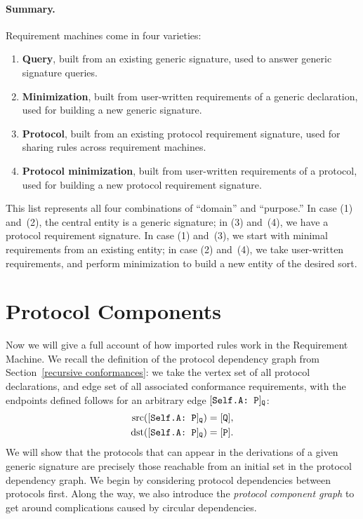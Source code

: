\documentclass[../generics]{subfiles}
\begin{document}
\paragraph{Summary.}
Requirement machines come in four varieties:
\begin{enumerate}
\item \textbf{Query}, built from an existing generic signature, used to answer generic signature queries.
\item \textbf{Minimization}, built from user-written requirements of a generic declaration, used for building a new generic signature.
\item \textbf{Protocol}, built from an existing protocol requirement signature, used for sharing rules across requirement machines.
\item \textbf{Protocol minimization}, built from user-written requirements of a protocol, used for building a new protocol requirement signature.
\end{enumerate}

This list represents all four combinations of ``domain'' and ``purpose.'' In case (1) and~(2), the central entity is a generic signature; in (3) and~(4), we have a protocol requirement signature. In case (1) and~(3), we start with minimal requirements from an existing entity; in case (2) and~(4), we take user-written requirements, and perform minimization to build a new entity of the desired sort.

\section{Protocol Components}\label{protocol component}

Now we will give a full account of how imported rules work in the Requirement Machine. We recall the definition of the protocol dependency graph from Section~\ref{recursive conformances}: we take the vertex set of all protocol declarations, and edge set of all associated conformance requirements, with the endpoints defined follows for an arbitrary edge $[\texttt{Self.A:~P}]_\texttt{Q}$:
\begin{align*}
\operatorname{src}([\texttt{Self.A:~P}]_\texttt{Q})&=[\texttt{Q}],\\
\operatorname{dst}([\texttt{Self.A:~P}]_\texttt{Q})&=[\texttt{P}].
\end{align*}
We will show that the protocols that can appear in the derivations of a given generic signature are precisely those reachable from an initial set in the protocol dependency graph. We begin by considering protocol dependencies between protocols first. Along the way, we also introduce the \emph{protocol component graph} to get around complications caused by circular dependencies.
\end{document}
